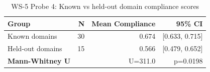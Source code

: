 \begin{table}[htbp]
\centering
\caption{WS-5 Probe 4: Known vs held-out domain compliance scores}
\label{tab:ws5-heldout}
\begin{tabular}{lrrr}
\toprule
Group & N & Mean Compliance & 95\% CI \\
\midrule
Known domains & 30 & 0.674 & [0.633, 0.715] \\
Held-out domains & 15 & 0.566 & [0.479, 0.652] \\
\textbf{Mann-Whitney U} &  & U=311.0 & p=0.0198 \\
\bottomrule
\end{tabular}
\end{table}
